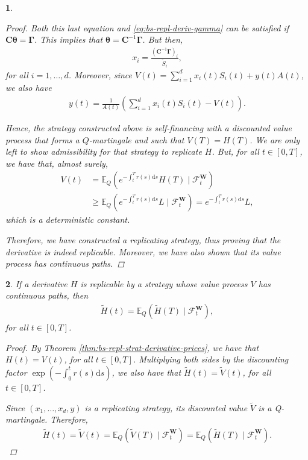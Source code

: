 \documentclass[english]{article}
\numberwithin{equation}{section}
\numberwithin{figure}{section}
\theoremstyle{bolddescit}
\newtheorem{theorem}{\protect\theoremname}[section]
\theoremstyle{definition}
\theoremstyle{definition}
\theoremstyle{plain}
\theoremstyle{plain}
\theoremstyle{bolddesc}
\theoremstyle{plain}
\theoremstyle{remark}
\providecommand{\theoremname}{Theorem}
\begin{document}
\begin{theorem}
\begin{proof}
    Both this last equation and \eqref{eq:bs-repl-deriv-gamma} can be satisfied if $\mathbf{C} \mathbf{\theta} = \mathbf{\Gamma}$. This implies that $\mathbf{\theta} = \mathbf{C}^{-1} \mathbf{\Gamma}$. But then,
    \begin{align*}
      x_i = \frac{(\mathbf{C}^{-1} \mathbf{\Gamma})_i}{\widetilde{S}_i},
    \end{align*}
    for all $i=1,\ldots,d$. Moreover, since $V(t) = \sum_{i=1}^d x_i(t) S_i(t) + y(t) A(t)$, we also have
    \begin{align*}
      y(t) = \frac{1}{A(t)} \left(\sum_{i=1}^d x_i(t) S_i(t) - V(t)\right).
    \end{align*}

    Hence, the strategy constructed above is self-financing with a discounted value process that forms a $Q$-martingale and such that $V(T) = H(T)$. We are only left to show admissibility for that strategy to replicate $H$. But, for all $t \in [0,T]$, we have that, almost surely,
    \begin{align*}
      V(t) &= \mathbb{E}_Q\left(e^{-\int_t^T r(s) \mathrm{d}s} H(T) \mid \mathcal{F}^\mathbf{W}_t\right)\\
      &\ge \mathbb{E}_Q\left(e^{-\int_t^T r(s) \mathrm{d}s} L \mid \mathcal{F}^\mathbf{W}_t\right)
      = e^{-\int_t^T r(s) \mathrm{d}s} L,
    \end{align*}
    which is a deterministic constant.

    Therefore, we have constructed a replicating strategy, thus proving that the derivative is indeed replicable. Moreover, we have also shown that its value process has continuous paths.
  \end{proof}
\end{theorem}

\begin{theorem}\label{thm:bs-derivative-pricing}
  If a derivative $H$ is replicable by a strategy whose value process $V$ has continuous paths, then
  \begin{align}\label{eq:bs-derivative-pricing}
    \widetilde{H}(t) = \mathbb{E}_Q(\widetilde{H}(T) \mid \mathcal{F}^\mathbf{W}_t),
  \end{align}
  for all $t \in [0,T]$.

  \begin{proof}
    By Theorem \ref{thm:bs-repl-strat-derivative-prices}, we have that $H(t) = V(t)$, for all $t \in [0,T]$. Multiplying both sides by the discounting factor $\exp\left(-\int_0^t r(s) \mathrm{d}s\right)$, we also have that $\widetilde{H}(t) = \widetilde{V}(t)$, for all $t \in [0,T]$.

    Since $(x_1, \ldots, x_d, y)$ is a replicating strategy, its discounted value $\widetilde{V}$ is a Q-martingale. Therefore,
    \begin{align*}
      \widetilde{H}(t) = \widetilde{V}(t)
      = \mathbb{E}_Q(\widetilde{V}(T) \mid \mathcal{F}^\mathbf{W}_t)
      = \mathbb{E}_Q(\widetilde{H}(T) \mid \mathcal{F}^\mathbf{W}_t).
    \end{align*}
  \end{proof}
\end{theorem}
\end{document}
